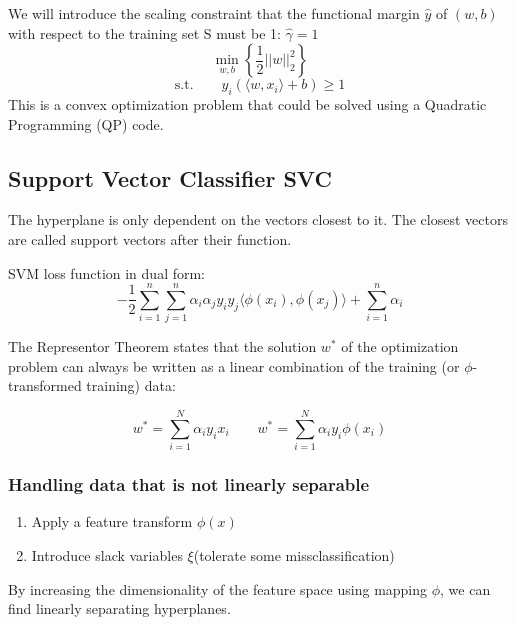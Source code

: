 We will introduce the scaling constraint that the functional margin \(\hat{y}\) of \((w,b)\) with respect to the training set S must be 1: \(\hat{\gamma} = 1\)
\[
\min_{w,b}\left\{\frac{1}{2} ||w||_2^2\right\}
\]
\[
\text{s.t.} \qquad y_i(\langle w,x_i \rangle + b) \ge 1
\]
This is a convex optimization problem that could be solved using a Quadratic Programming (QP) code.
\subsection{Support Vector Classifier SVC}
The hyperplane is only dependent on the vectors closest to it.
The closest vectors are called support vectors after their function.

SVM loss function in dual form:
\[
-\frac{1}{2}\sum_{i = 1}^{n}\sum_{j = 1}^{n}\alpha_i\alpha_j y_i y_j\langle \phi(x_i),\phi(x_j) \rangle + \sum_{i = 1}^{n} \alpha_i
\]

The Representor Theorem states that the solution \(w^*\) of the optimization problem can always be written as a linear combination of the training (or \(\phi\)-transformed training) data:

\[
w^* = \sum_{i = 1}^{N}\alpha_i y_i x_i \qquad w^* = \sum_{i = 1}^{N}\alpha_i y_i \phi(x_i)
\]
\subsubsection{Handling data that is not linearly separable}
\begin{enumerate}
    \item Apply a feature transform \(\phi(x)\)
    \item Introduce slack variables \(\xi\)(tolerate some missclassification)
\end{enumerate}
By increasing the dimensionality of the feature space using mapping \(\phi\), we can find linearly separating hyperplanes.
